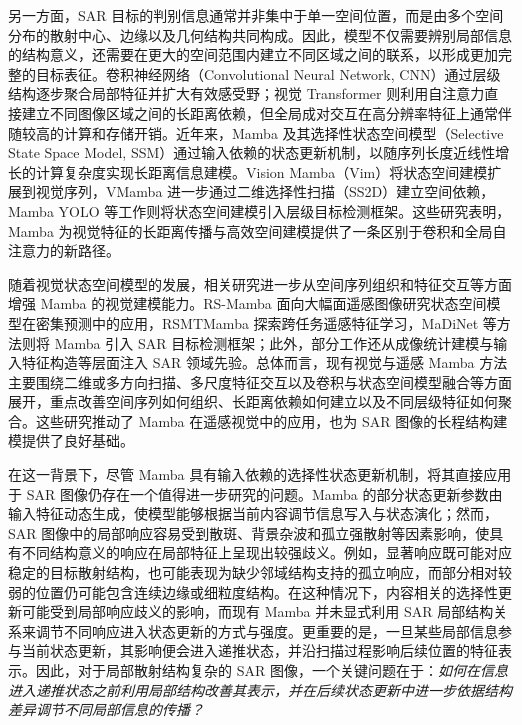 \documentclass[journal]{IEEEtran}
\begin{document}
另一方面，SAR 目标的判别信息通常并非集中于单一空间位置，而是由多个空间分布的散射中心、边缘以及几何结构共同构成。因此，模型不仅需要辨别局部信息的结构意义，还需要在更大的空间范围内建立不同区域之间的联系，以形成更加完整的目标表征。卷积神经网络（Convolutional Neural Network, CNN）通过层级结构逐步聚合局部特征并扩大有效感受野\cite{resnet2015}；视觉 Transformer 则利用自注意力直接建立不同图像区域之间的长距离依赖\cite{vit2020}，但全局成对交互在高分辨率特征上通常伴随较高的计算和存储开销。近年来，Mamba 及其选择性状态空间模型（Selective State Space Model, SSM）通过输入依赖的状态更新机制，以随序列长度近线性增长的计算复杂度实现长距离信息建模\cite{mamba2023}。Vision Mamba（Vim）将状态空间建模扩展到视觉序列\cite{vim2024}，VMamba 进一步通过二维选择性扫描（SS2D）建立空间依赖\cite{vmamba2024}，Mamba YOLO 等工作则将状态空间建模引入层级目标检测框架\cite{mambayolo2024}。这些研究表明，Mamba 为视觉特征的长距离传播与高效空间建模提供了一条区别于卷积和全局自注意力的新路径。

随着视觉状态空间模型的发展，相关研究进一步从空间序列组织和特征交互等方面增强 Mamba 的视觉建模能力。RS-Mamba 面向大幅面遥感图像研究状态空间模型在密集预测中的应用\cite{rsmamba2024}，RSMTMamba 探索跨任务遥感特征学习\cite{rstmtmamba2025}，MaDiNet 等方法则将 Mamba 引入 SAR 目标检测框架\cite{madinet2025}；此外，部分工作还从成像统计建模与输入特征构造等层面注入 SAR 领域先验\cite{mambadip,rssnet}。总体而言，现有视觉与遥感 Mamba 方法主要围绕二维或多方向扫描、多尺度特征交互以及卷积与状态空间模型融合等方面展开，重点改善空间序列如何组织、长距离依赖如何建立以及不同层级特征如何聚合。这些研究推动了 Mamba 在遥感视觉中的应用，也为 SAR 图像的长程结构建模提供了良好基础。

在这一背景下，尽管 Mamba 具有输入依赖的选择性状态更新机制，将其直接应用于 SAR 图像仍存在一个值得进一步研究的问题。Mamba 的部分状态更新参数由输入特征动态生成，使模型能够根据当前内容调节信息写入与状态演化；然而，SAR 图像中的局部响应容易受到散斑、背景杂波和孤立强散射等因素影响，使具有不同结构意义的响应在局部特征上呈现出较强歧义。例如，显著响应既可能对应稳定的目标散射结构，也可能表现为缺少邻域结构支持的孤立响应，而部分相对较弱的位置仍可能包含连续边缘或细粒度结构。在这种情况下，内容相关的选择性更新可能受到局部响应歧义的影响，而现有 Mamba 并未显式利用 SAR 局部结构关系来调节不同响应进入状态更新的方式与强度。更重要的是，一旦某些局部信息参与当前状态更新，其影响便会进入递推状态，并沿扫描过程影响后续位置的特征表示。因此，对于局部散射结构复杂的 SAR 图像，一个关键问题在于：\emph{如何在信息进入递推状态之前利用局部结构改善其表示，并在后续状态更新中进一步依据结构差异调节不同局部信息的传播？}
\end{document}
